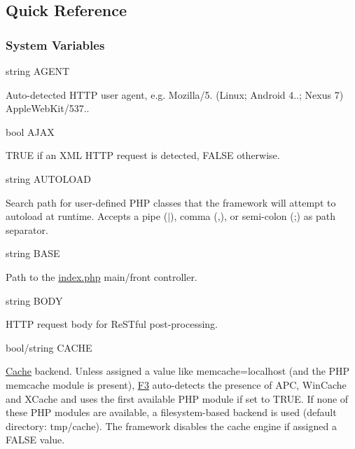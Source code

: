 \subsection*{Quick Reference}

\subsubsection*{System Variables}

{\ttfamily string A\+G\+E\+NT}


\begin{DoxyItemize}
\item Auto-\/detected H\+T\+TP user agent, e.\+g. {\ttfamily Mozilla/5. (Linux; Android 4..; Nexus 7) Apple\+Web\+Kit/537.}.
\end{DoxyItemize}

{\ttfamily bool A\+J\+AX}


\begin{DoxyItemize}
\item {\ttfamily T\+R\+UE} if an X\+ML H\+T\+TP request is detected, {\ttfamily F\+A\+L\+SE} otherwise.
\end{DoxyItemize}

{\ttfamily string A\+U\+T\+O\+L\+O\+AD}


\begin{DoxyItemize}
\item Search path for user-\/defined P\+HP classes that the framework will attempt to autoload at runtime. Accepts a pipe ({\ttfamily $\vert$}), comma ({\ttfamily ,}), or semi-\/colon ({\ttfamily ;}) as path separator.
\end{DoxyItemize}

{\ttfamily string B\+A\+SE}


\begin{DoxyItemize}
\item Path to the {\ttfamily \hyperlink{index_8php_source}{index.\+php}} main/front controller.
\end{DoxyItemize}

{\ttfamily string B\+O\+DY}


\begin{DoxyItemize}
\item H\+T\+TP request body for Re\+S\+Tful post-\/processing.
\end{DoxyItemize}

{\ttfamily bool/string C\+A\+C\+HE}


\begin{DoxyItemize}
\item \hyperlink{class_cache}{Cache} backend. Unless assigned a value like {\ttfamily \textquotesingle{}memcache=localhost\textquotesingle{}} (and the P\+HP memcache module is present), \hyperlink{class_f3}{F3} auto-\/detects the presence of A\+PC, Win\+Cache and X\+Cache and uses the first available P\+HP module if set to T\+R\+UE. If none of these P\+HP modules are available, a filesystem-\/based backend is used (default directory\+: {\ttfamily tmp/cache}). The framework disables the cache engine if assigned a {\ttfamily F\+A\+L\+SE} value.
\end{DoxyItemize}

